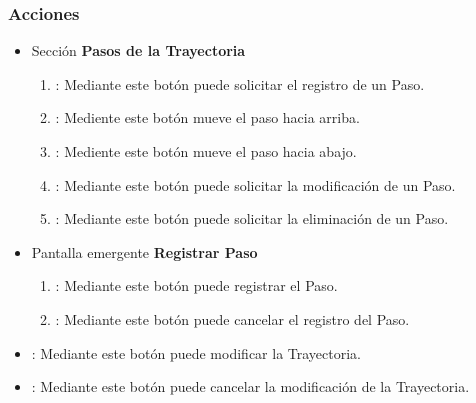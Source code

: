 \subsubsection{Acciones}
\begin{itemize}
 \item Sección \textbf{Pasos de la Trayectoria}
  \begin{enumerate}
	\item {}: Mediante este botón puede solicitar el registro de un Paso.
	\item {}: Mediente este botón mueve el paso hacia arriba.
	\item {}: Mediente este botón mueve el paso hacia abajo.
	\item {}: Mediante este botón puede solicitar la modificación de un Paso.
	\item {}: Mediante este botón puede solicitar la eliminación de un Paso.
  \end{enumerate}
  \item Pantalla emergente \textbf{Registrar Paso}
  \begin{enumerate}
	\item {}: Mediante este botón puede registrar el Paso.
	\item {}: Mediante este botón puede cancelar el registro del Paso.
  \end{enumerate}
  \item {}: Mediante este botón puede modificar la Trayectoria.
  \item {}: Mediante este botón puede cancelar la modificación de la Trayectoria.
\end{itemize}
	
	
